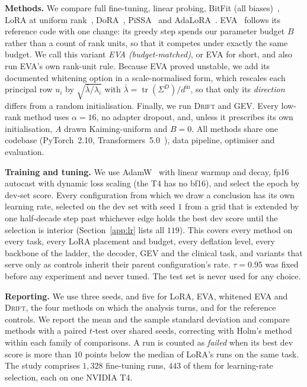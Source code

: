 \documentclass[conference]{IEEEtran}
\newcommand{\method}{\textsc{Drift}}
\newcommand{\tr}{\operatorname{tr}}
\begin{document}
\noindent\textbf{Methods.} We compare full fine-tuning, linear probing, BitFit
(all biases)~\cite{benzaken2022bitfit}, LoRA at uniform rank~\cite{hu2022lora},
DoRA~\cite{liu2024dora}, PiSSA~\cite{meng2024pissa} and
AdaLoRA~\cite{zhang2023adalora}. EVA~\cite{paischer2025eva} follows its
reference code with one change: its greedy step spends our parameter budget $B$
rather than a count of rank units, so that it competes under exactly the same
budget. We call this variant \emph{EVA (budget-matched)}, or EVA for short, and
also run EVA's own rank-unit rule. Because EVA proved unstable, we add its
documented whitening option in a scale-normalised form, which rescales each
principal row $u_i$ by $\sqrt{\bar\lambda/\lambda_i}$ with
$\bar\lambda = \tr(\Sigma^{D})/d^{\mathrm{in}}$, so that only its
\emph{direction} differs from a random initialisation. Finally, we run \method{}
and GEV. Every low-rank method uses $\alpha = 16$, no adapter dropout, and,
unless it prescribes its own initialisation, $A$ drawn Kaiming-uniform and
$B = 0$. All methods share one codebase (PyTorch~2.10,
Transformers~5.0~\cite{wolf2020transformers}), data pipeline, optimiser and
evaluation.

\noindent\textbf{Training and tuning.} We use AdamW~\cite{loshchilov2019adamw}
with linear warmup and decay, fp16 autocast with dynamic loss scaling (the T4 has
no bf16), and select the epoch by dev-set score. Every configuration from which
we draw a conclusion has its own learning rate, selected on the dev set with seed
$1$ from a grid that is extended by one half-decade step past whichever edge
holds the best dev score until the selection is interior
(Section~\ref{app:lr} lists all $119$). This covers every method on every task,
every LoRA placement and budget, every deflation level, every backbone of the
ladder, the decoder, GEV and the clinical task, and variants that serve only as
controls inherit their parent configuration's rate. $\tau = 0.95$ was fixed
before any experiment and never tuned. The test set is never used for any choice.

\noindent\textbf{Reporting.}
We use three seeds, and five for LoRA, EVA, whitened EVA and \method{}, the four
methods on which the analysis turns, and for the reference controls. We report
the mean and the sample standard deviation and compare methods with a paired
$t$-test over shared seeds, correcting with Holm's method~\cite{holm1979} within
each family of comparisons. A run is counted as \emph{failed} when its best dev
score is more than $10$ points below the median of LoRA's runs on the same task.
The study comprises $1{,}328$ fine-tuning runs, $443$ of them for learning-rate
selection, each on one NVIDIA T4.
\end{document}

